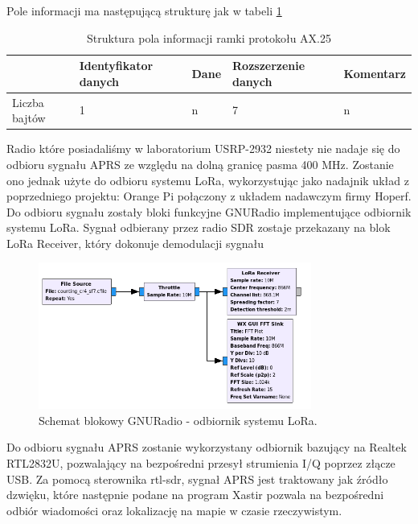 Pole informacji ma następującą strukturę jak w tabeli \ref{str}

\begin{table}
\centering
\begin{tabular}{|l|l|l|l|l|}
\hline
  & Identyfikator danych & Dane & Rozszerzenie danych & Komentarz\\\hline
Liczba bajtów & 1 & n & 7 & n\\\hline
\end{tabular}
\caption{Struktura pola informacji ramki protokołu AX.25}
\label{str}
\end{table}

Radio które posiadaliśmy w laboratorium USRP-2932 niestety nie nadaje się do odbioru sygnału APRS ze względu na dolną granicę pasma 400 MHz. Zostanie ono jednak użyte do odbioru systemu LoRa, wykorzystując jako nadajnik układ z poprzedniego projektu: Orange Pi połączony z układem nadawczym firmy Hoperf. Do odbioru sygnału zostały bloki funkcyjne GNURadio implementujące odbiornik systemu LoRa. Sygnał odbierany przez radio SDR zostaje przekazany na blok LoRa Receiver, który dokonuje demodulacji sygnału
\begin{figure}[!htbp]
 \includegraphics[width=0.8\textwidth]{lora_pic}
 \centering
 \caption{Schemat blokowy GNURadio - odbiornik systemu LoRa.}
\end{figure}


Do odbioru sygnału APRS zostanie wykorzystany odbiornik bazujący na Realtek RTL2832U, pozwalający na bezpośredni przesył strumienia I/Q poprzez złącze USB. Za pomocą sterownika rtl-sdr, sygnał APRS jest traktowany jak źródło dzwięku, które następnie podane na program Xastir pozwala na bezpośredni odbiór wiadomości oraz lokalizację na mapie w czasie rzeczywistym.

